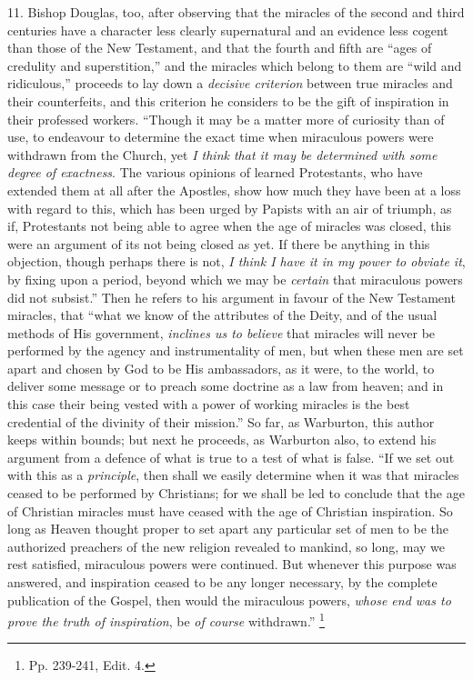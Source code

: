 11.
Bishop Douglas, too, after observing that the miracles of the second
and third centuries have a character less clearly supernatural and an
evidence less cogent than those of the New Testament, and that the
fourth and fifth are ``ages of credulity and superstition,''
and the miracles which belong to them are ``wild and ridiculous,''
proceeds to lay down a \emph{decisive criterion} between true miracles
and their counterfeits, and this criterion he considers to be the gift
of inspiration in their professed workers. ``Though it may be a
matter more of curiosity than of use, to endeavour to determine the
exact time when miraculous powers were withdrawn from the Church, yet \emph{I
think that it may be determined with some degree of exactness}. The
various opinions of learned Protestants, who have extended them at all
after the Apostles, show how much they have been at a loss with regard
to this, which has been urged by Papists with an air of triumph, as
if, Protestants not being able to agree when the age of miracles was
closed, this were an argument of its not being closed as yet. If there
be anything in this objection, though perhaps there is not, \emph{I think
I have it in my power to obviate it}, by fixing upon a period,
beyond which we may be \emph{certain} that miraculous powers did not
subsist.'' Then he refers to his argument in favour of the New
Testament miracles, that ``what we know of the attributes of the
Deity, and of the usual methods of His government, \emph{inclines us to
believe} that miracles will never be performed by the agency and
instrumentality of men, but when these men are set apart and chosen by
God to be His ambassadors, as it were, to the world, to deliver some
message or to preach some doctrine as a law from heaven; and in
this case their being vested with a power of working miracles is the
best credential of the divinity of their mission.'' So far, as
Warburton, this author keeps within bounds; but next he proceeds, as
Warburton also, to extend his argument from a defence of what is true
to a test of what is false. ``If we set out with this as a \emph{principle},
then shall we easily determine when it was that miracles ceased to be
performed by Christians; for we shall be led to conclude that the age
of Christian miracles must have ceased with the age of Christian
inspiration. So long as Heaven thought proper to set apart any
particular set of men to be the authorized preachers of the new
religion revealed to mankind, so long, may we rest satisfied,
miraculous powers were continued. But whenever this purpose was
answered, and inspiration ceased to be any longer necessary, by the
complete publication of the Gospel, then would the miraculous powers, \emph{whose
end was to prove the truth of inspiration}, be \emph{of course}
withdrawn.'' \footnote{Pp. 239-241, Edit. 4.}

